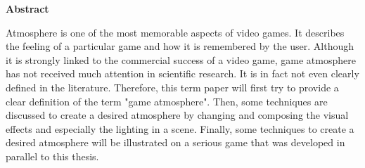 \newpage

\vspace*{1cm}

\begin{center}
    \textbf{Abstract}
\end{center}

\vspace*{1cm}

\noindent 
Atmosphere is one of the most memorable aspects of video games. It describes the feeling of a particular game and how it is remembered by the user. Although it is strongly linked to the commercial success of a video game, game atmosphere has not received much attention in scientific research. It is in fact not even clearly defined in the literature. Therefore, this term paper will first try to provide a clear definition of the term "game atmosphere". Then, some techniques are discussed to create a desired atmosphere by changing and composing the visual effects and especially the lighting in a scene. Finally, some techniques to create a desired atmosphere will be illustrated on a serious game that was developed in parallel to this thesis. 